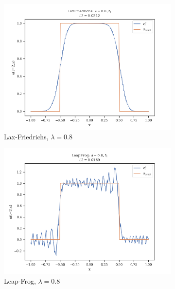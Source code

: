 \begin{figure}
\begin{subfigure}{0.3\linewidth}
        \includegraphics[width=\linewidth]{figures/LaxFriedrichs/LaxFriedrichs_lambda=0.8,f1}
        \caption{Lax-Friedrichs, $\lambda =0.8$}
    \end{subfigure}
    \hfill
    \begin{subfigure}{0.3\linewidth}
        \centering
        \includegraphics[width=\linewidth]{figures/LeapFrog/LeapFrog_lambda=0.8,f1}
        \caption{Leap-Frog, $\lambda =0.8$}
    \end{subfigure}
    \hfill
    \vspace{1cm}
    \begin{subfigure}{0.3\linewidth}
        \centering

\end{subfigure}
\end{figure}
